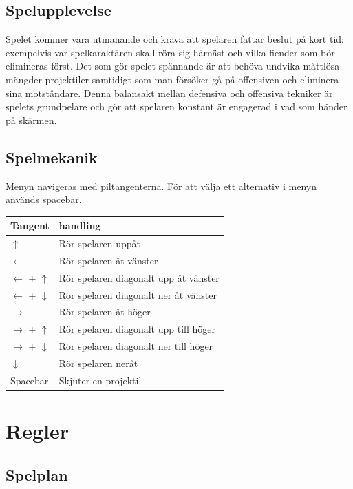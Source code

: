 \documentclass{TDP005mall}
\begin{document}
\subsection{Spelupplevelse}

Spelet kommer vara utmanande och kräva att spelaren fattar beslut på kort tid: exempelvis var spelkaraktären skall röra sig härnäst och vilka fiender som bör elimineras först.
Det som gör spelet spännande är att behöva undvika måttlösa mängder projektiler samtidigt som man försöker gå på offensiven och eliminera sina motståndare.
Denna balansakt mellan defensiva och offensiva tekniker är spelets grundpelare och gör att spelaren konstant är engagerad i vad som händer på skärmen.  

\subsection{Spelmekanik}
Menyn navigeras med piltangenterna. För att välja ett alternativ i menyn används spacebar.
\begin{table}[h]
\begin{tabularx}{\linewidth}{|l|X|}
\hline
  Tangent & handling \\\hline
  $\uparrow$ & Rör spelaren uppåt \\\hline
  $\leftarrow$ & Rör spelaren åt vänster \\\hline
  $\leftarrow$ + $\uparrow$ & Rör spelaren diagonalt upp åt vänster \\\hline
  $\leftarrow$ + $\downarrow$ & Rör spelaren diagonalt ner åt vänster \\\hline
  $\rightarrow$ & Rör spelaren åt höger \\\hline
  $\rightarrow$ + $\uparrow$ & Rör spelaren diagonalt upp till höger \\\hline
  $\rightarrow$ + $\downarrow$ & Rör spelaren diagonalt ner till höger \\\hline
  $\downarrow$ & Rör spelaren neråt \\\hline
  Spacebar & Skjuter en projektil \\\hline  
\end{tabularx}
\end{table}
\section{Regler}
\subsection{Spelplan}
\end{document}
